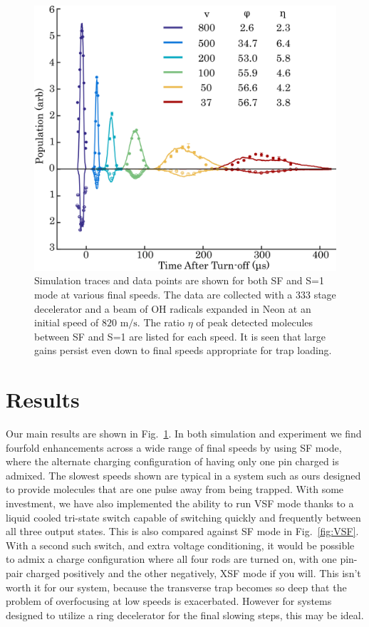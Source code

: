 \documentclass[%
 reprint,
 amsmath,amssymb,
 aps,
pra,
]{revtex4-1}
\begin{document}
\begin{figure}[t]
\includegraphics[width=\linewidth]{speedvary.png}%
\caption{
Simulation traces and data points are shown for both SF and S=1 mode at various final speeds. The data are collected with a $333$ stage decelerator and a beam of OH radicals expanded in Neon at an initial speed of $820\text{ m/s}$. The ratio $\eta$ of peak detected molecules between SF and S=1 are listed for each speed. It is seen that large gains persist even down to final speeds appropriate for trap loading.
}
\label{fig:speedvary}
\end{figure}


\section{Results}
Our main results are shown in Fig.~\ref{fig:speedvary}. In both simulation and experiment we find fourfold enhancements across a wide range of final speeds by using SF mode, where the alternate charging configuration of having only one pin charged is admixed. The slowest speeds shown are typical in a system such as ours designed to provide molecules that are one pulse away from being trapped. With some investment, we have also implemented the ability to run VSF mode thanks to a liquid cooled tri-state switch capable of switching quickly and frequently between all three output states. This is also compared against SF mode in Fig.~\ref{fig:VSF}. With a second such switch, and extra voltage conditioning, it would be possible to admix a charge configuration where all four rods are turned on, with one pin-pair charged positively and the other negatively, XSF mode if you will. This isn't worth it for our system, because the transverse trap becomes so deep that the problem of overfocusing at low speeds is exacerbated. However for systems designed to utilize a ring decelerator for the final slowing steps, this may be ideal.
\end{document}
